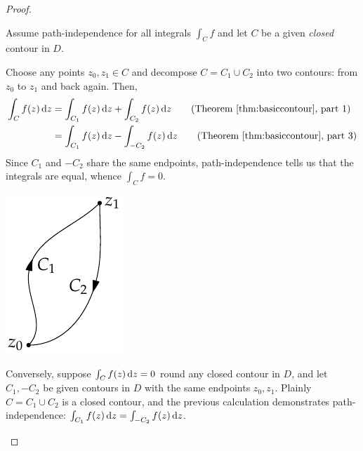 \begin{proof}
	\begin{description}\itemsep2pt
		\item[\normalfont ($\Rightarrow$)] Assume path-independence for all integrals $\int_Cf$ and let $C$ be a given \emph{closed} contour in $D$.\par
		\begin{minipage}[t]{0.8\linewidth}\vspace{-12pt}
			Choose any points $z_0,z_1\in C$ and decompose $C=C_1\cup C_2$ into two contours: from $z_0$ to $z_1$ and back again. Then,
			\begin{align*}
				\int_Cf(z)\,\dz&=\int_{C_1}f(z)\,\dz+\int_{C_2}f(z)\,\dz \tag{Theorem \ref{thm:basiccontour}, part 1}\\
				&=\int_{C_1}f(z)\,\dz-\int_{-C_2}f(z)\,\dz \tag{Theorem \ref{thm:basiccontour}, part 3}
			\end{align*}
			Since $C_1$ and $-C_2$ share the same endpoints, path-independence tells us that the integrals are equal, whence $\int_Cf=0$.
		\end{minipage} 
		\hfill
		\begin{minipage}[t]{0.19\linewidth}\vspace{-10pt}
			\flushright\includegraphics{ftc-1}
		\end{minipage}\par
		\item[\normalfont ($\Leftarrow$)] Conversely, suppose $\int_Cf(z)\,{\mathrm{d} z}=0$ round any closed contour in $D$, and let $C_1,-C_2$ be given contours in $D$ with the same endpoints $z_0,z_1$.\newline
		Plainly $C=C_1\cup C_2$ is a closed contour, and the previous calculation demonstrates path-independence:  $\int_{C_1}f(z)\,{\mathrm{d} z}=\int_{-C_2}f(z)\,{\mathrm{d} z}$.\qedhere
	\end{description}
\end{proof}


